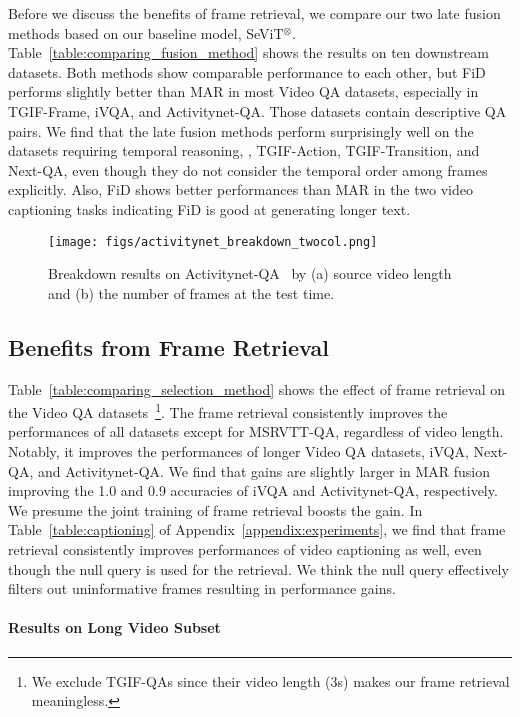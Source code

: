 \documentclass{article}
\newcommand{\frameworkname}{SeViT}
\begin{document}
Before we discuss the benefits of frame retrieval, we compare our two late fusion methods based on our baseline model, \frameworkname{}$^{\otimes}$. Table~\ref{table:comparing_fusion_method} shows the results on ten downstream datasets. Both methods show comparable performance to each other, but FiD performs slightly better than MAR in most Video QA datasets, especially in TGIF-Frame, iVQA, and Activitynet-QA. Those datasets contain descriptive QA pairs. We find that the late fusion methods perform surprisingly well on the datasets requiring temporal reasoning, \eg, TGIF-Action, TGIF-Transition, and Next-QA, even though they do not consider the temporal order among frames explicitly. Also, FiD shows better performances than MAR in the two video captioning tasks indicating FiD is good at generating longer text.

\begin{figure*}[t!] 
\centering
\texttt{[image: figs/activitynet\_breakdown\_twocol.png]}
\caption{Breakdown results on Activitynet-QA~\cite{yu2019activitynet} by (a) source video length and (b) the number of frames at the test time.}
\label{fig:activitynet}
\end{figure*} 
\subsection{Benefits from Frame Retrieval}


Table~\ref{table:comparing_selection_method} shows the effect of frame retrieval on the Video QA datasets~\footnote{We exclude TGIF-QAs since their video length (3s) makes our frame retrieval meaningless.}. The frame retrieval consistently improves the performances of all datasets except for MSRVTT-QA, regardless of video length. Notably, it improves the performances of longer Video QA datasets, iVQA, Next-QA, and Activitynet-QA. We find that gains are slightly larger in MAR fusion improving the 1.0 and 0.9 accuracies of iVQA and Activitynet-QA, respectively. We presume the joint training of frame retrieval boosts the gain. In Table~\ref{table:captioning} of Appendix~\ref{appendix:experiments}, we find that frame retrieval consistently improves performances of video captioning as well, even though the null query is used for the retrieval. We think the null query effectively filters out uninformative frames resulting in performance gains.

\paragraph{Results on Long Video Subset}
\end{document}
